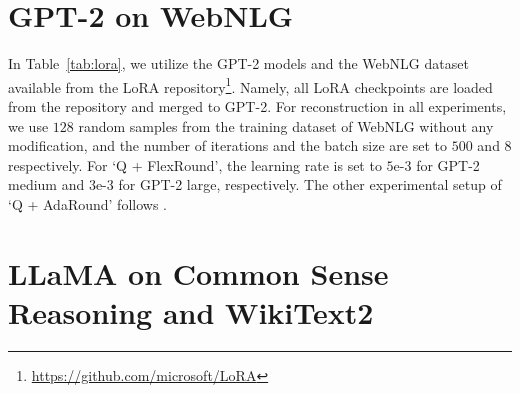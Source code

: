 \documentclass{article}
\theoremstyle{plain}
\theoremstyle{definition}
\theoremstyle{remark}
\begin{document}
\newpage

\section{GPT-2 on WebNLG}\label{appendix:webnlg}

In Table~\ref{tab:lora}, we utilize the GPT-2 models and the WebNLG dataset available from the LoRA repository\footnote{\url{https://github.com/microsoft/LoRA}}. Namely, all LoRA checkpoints are loaded from the repository and merged to GPT-2. For reconstruction in all experiments, we use $128$ random samples from the training dataset of WebNLG without any modification, and the number of iterations and the batch size are set to $500$ and $8$ respectively. For `Q + FlexRound', the learning rate is set to $5$e-$3$ for GPT-2 medium and $3$e-$3$ for GPT-2 large, respectively. The other experimental setup of `Q + AdaRound' follows \citet{wei2022qdrop}. 



\newpage

\section{LLaMA on Common Sense Reasoning and WikiText2}\label{appendix:llama}
\end{document}
